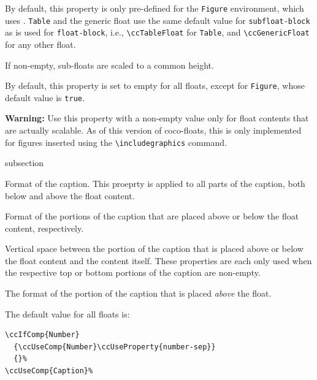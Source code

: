 By default, this property is only pre-defined for the \lstinline{Figure}
environment, which uses
\texttt{\string\ccFigureSubFloat}. \lstinline{Table} and the generic
float use the same default value for \lstinline{subfloat-block} as is
used for \lstinline{float-block}, i.e., \lstinline{\ccTableFloat} for
\lstinline{Table}, and \lstinline{\ccGenericFloat} for any other
float.


If non-empty, sub-floats are scaled to a common height. 

By default, this property is set to empty for all floats, except for
\lstinline{Figure}, whose default value is \lstinline{true}. 

\textbf{Warning:} Use this property with a non-empty value only for
float contents that are actually scalable. As of this version of
coco-floats, this is only implemented for figures inserted using
the \lstinline{\includegraphics} command.

\begin{Heading}[label=sec:flt:capt]{subsection}
\end{Heading}


Format of the caption. This proeprty is applied to all parts of the
caption, both below and above the float content.


Format of the portions of the caption that are placed above or below
the float content, respectively.


Vertical space between the portion of the caption that is placed above
or below the float content and the content itself. These properties
are each only used when the respective top or bottom portions of the
caption are non-empty.



The format of the portion of the caption that is placed \textit{above}
the float.

The default value for all floats is:
\begin{lstlisting}[style=tex]
\ccIfComp{Number}
  {\ccUseComp{Number}\ccUseProperty{number-sep}}
  {}%
\ccUseComp{Caption}%
\end{lstlisting}

